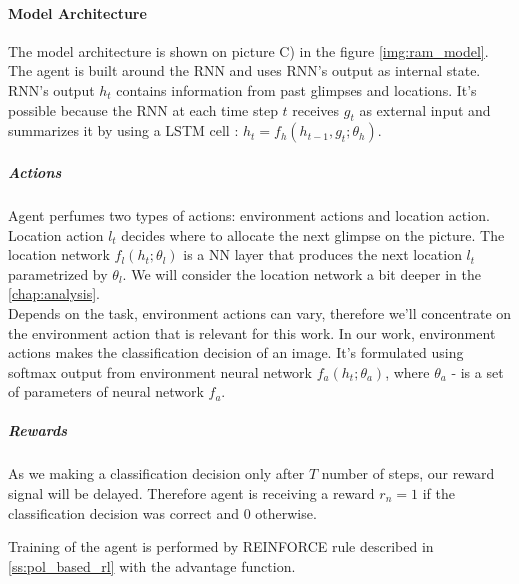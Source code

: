\paragraph{Model Architecture} The model architecture is shown
on picture C) in the figure \ref{img:ram_model}. The agent is built around
the RNN and uses RNN's output as internal state. RNN's output $h_t$ contains
information from past glimpses and locations. It's possible
because the RNN at each time step $t$ receives $g_t$ as external input and
summarizes it by using a LSTM cell : $h_t = f_h(h_{t-1}, g_t; \theta_h)$.

\subparagraph{Actions} Agent perfumes two types of actions: environment actions
and location action. Location action $l_t$ decides where to allocate the next glimpse
on the picture. The location network $f_l(h_t; \theta_l)$ is a NN layer
that produces the next location $l_t$ parametrized by $\theta_l$. We will consider the
location network a bit deeper in the \autoref{chap:analysis}. \\
Depends on the task, environment actions can vary, therefore
we'll concentrate on the environment action that is relevant for this work.
In our work, environment actions makes the classification decision of an image.
It's formulated using softmax output from environment neural network
 $f_a(h_t; \theta_a)$, where $\theta_a$ - is a set of parameters of neural network $f_a$.

\subparagraph{Rewards} As we making a classification decision only after $T$
number of steps, our reward signal will be delayed. Therefore agent is receiving
a reward $r_n = 1$ if the classification decision was correct and $0$ otherwise.


Training of the agent is performed by REINFORCE rule
described in \autoref{ss:pol_based_rl} with the advantage function.










